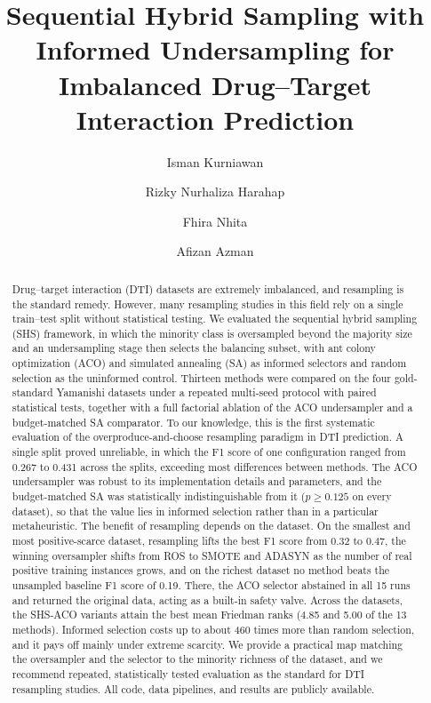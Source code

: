 \documentclass[10pt,a4paper]{article}
\title{Sequential Hybrid Sampling with Informed Undersampling for
Imbalanced Drug--Target Interaction Prediction}
\author[1,*]{Isman Kurniawan}
\author[2]{Rizky Nurhaliza Harahap}
\author[1]{Fhira Nhita}
\author[3]{Afizan Azman}
\affil[1]{School of Computing, Telkom University, Bandung, Indonesia}
\affil[2]{Asia Pacific Resources International Holdings Limited (APRIL),
          Pangkalan Kerinci, Riau, Indonesia}
\affil[3]{Taylor's University, 1, Jln Taylors, 47500 Subang Jaya, Selangor,
          Malaysia}
\affil[*]{Corresponding author: ismankrn@telkomuniversity.ac.id}
\date{}
\begin{document}
\maketitle
\linenumbers  %

\begin{abstract}
Drug--target interaction (DTI) datasets are extremely imbalanced, and
resampling is the standard remedy. However, many resampling studies in
this field rely on a single train--test split without statistical
testing. We evaluated the sequential hybrid sampling (SHS) framework, in
which the minority class is oversampled beyond the majority size and an
undersampling stage then selects the balancing subset, with ant colony
optimization (ACO) and simulated annealing (SA) as informed selectors
and random selection as the uninformed control. Thirteen methods were
compared on the four gold-standard Yamanishi datasets under a repeated
multi-seed protocol with paired statistical tests, together with a full
factorial ablation of the ACO undersampler and a budget-matched SA
comparator. To our knowledge, this is the first systematic evaluation
of the overproduce-and-choose resampling paradigm in DTI prediction. A
single split proved unreliable, in which the F1 score of
one configuration ranged from 0.267 to 0.431 across the splits,
exceeding most differences between methods. The ACO undersampler was
robust to its implementation details and parameters, and the
budget-matched SA was statistically indistinguishable from it
($p \geq 0.125$ on every dataset), so that the value lies in informed
selection rather than in a particular metaheuristic. The benefit of resampling depends on the dataset. On the
smallest and most positive-scarce dataset, resampling lifts the best F1
score from 0.32 to 0.47, the winning oversampler shifts from ROS to
SMOTE and ADASYN as the number of real positive training instances
grows, and on the richest dataset no method beats the unsampled baseline
F1 score of 0.19. There, the ACO selector abstained in all 15 runs and
returned the original data, acting as a built-in safety valve. Across
the datasets, the SHS-ACO variants attain the best mean Friedman ranks
(4.85 and 5.00 of the 13 methods). Informed selection costs up to about 460 times more than random selection, and it pays off mainly under
extreme scarcity. We provide a practical map matching the oversampler
and the selector to the minority richness of the dataset, and we
recommend repeated, statistically tested evaluation as the standard for
DTI resampling studies. All code, data pipelines, and results are
publicly available.
\end{abstract}
\end{document}
